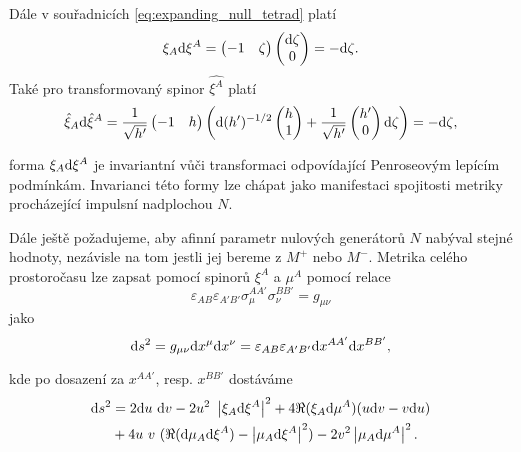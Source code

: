 Dále v souřadnicích \eqref{eq:expanding_null_tetrad} platí
\begin{equation}
    \xi_A \mathrm{d} \xi^A = \begin{pmatrix}
        -1 & \zeta
    \end{pmatrix}
    \begin{pmatrix}
        \mathrm{d}\zeta \\ 0
    \end{pmatrix} = -\mathrm{d}\zeta.
\end{equation}
Také pro transformovaný spinor $\hat{\xi^A}$ platí
\begin{equation}
    \hat{\xi}_A \mathrm{d} \hat{\xi}^A = \frac{1}{\sqrt{h'}} \begin{pmatrix}
        -1 & h
    \end{pmatrix}  \left( \mathrm{d} (h')^{-1/2} \begin{pmatrix}
        h \\ 1
    \end{pmatrix} + \frac{1}{\sqrt{h'}} \begin{pmatrix}
        h' \\ 0
    \end{pmatrix} \mathrm{d} \zeta \right) = -\mathrm{d} \zeta,
\end{equation}

forma $\xi_A \mathrm{d} \xi^A$ je invariantní vůči transformaci odpovídající
Penroseovým lepícím podmínkám. Invarianci této formy lze chápat jako
manifestaci spojitosti metriky procházející impulsní nadplochou $N$.

Dále ještě požadujeme, aby afinní parametr nulových generátorů $N$ nabýval stejné
hodnoty, nezávisle na tom jestli jej bereme z $M^+$ nebo $M^-$. Metrika celého
prostoročasu lze zapsat pomocí spinorů $\xi^A$ a $\mu^A$ pomocí relace \cite{doi:10.1142/5222}
\begin{equation}
    \varepsilon_{AB} \varepsilon_{A'B'} \sigma_{\mu}^{AA'} \sigma_{\nu}^{BB'} = g_{\mu \nu}
\end{equation}
jako
\begin{equation}
    \mathrm{d} s^2 = g_{\mu \nu} \mathrm{d} x^\mu \mathrm{d} x^\nu = \varepsilon_{AB} \varepsilon_{A'B'} \mathrm{d} x^{AA'} \mathrm{d} x^{BB'},
\end{equation}

kde po dosazení za $x^{AA'}$, resp. $x^{BB'}$ dostáváme
\begin{equation}
    \begin{split}
        \mathrm{d} s^2 &= 2 \mathrm{d} u ~ \mathrm{d} v - 2 u^2 ~ \left| \xi_A \mathrm{d} \xi^A \right|^2 + 4 \Re(\xi_A \mathrm{d} \mu^A)(u \mathrm{d} v - v \mathrm{d} u) \\
        &+ 4 u ~v ~ (\Re(\mathrm{d} \mu_A \mathrm{d} \xi^A) - \left|\mu_A \mathrm{d} \xi^A \right|^2) - 2 v^2 \left|\mu_A \mathrm{d} \mu^A \right|^2.
    \end{split}
\end{equation}

